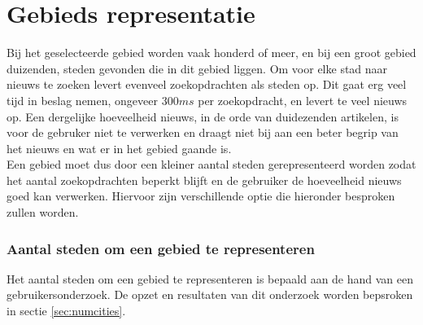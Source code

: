 \documentclass[twoside,openright]{uva-bachelor-thesis}
\begin{document}
	\section{Gebieds representatie}
		Bij het geselecteerde gebied worden vaak honderd of meer, en bij een groot gebied duizenden, steden gevonden die in dit gebied liggen. Om voor elke stad naar nieuws te zoeken levert evenveel zoekopdrachten als steden op. Dit gaat erg veel tijd in beslag nemen, ongeveer $300ms$ per zoekopdracht, en levert te veel nieuws op. Een dergelijke hoeveelheid nieuws, in de orde van duidezenden artikelen, is voor de gebruker niet te verwerken en draagt niet bij aan een beter begrip van het nieuws en wat er in het gebied gaande is.
		\\[0.5cm]
		Een gebied moet dus door een kleiner aantal steden gerepresenteerd worden zodat het aantal zoekopdrachten beperkt blijft en de gebruiker de hoeveelheid nieuws goed kan verwerken. Hiervoor zijn verschillende optie die hieronder besproken zullen worden.
		
		\subsubsection{Aantal steden om een gebied te representeren}
			Het aantal steden om een gebied te representeren is bepaald aan de hand van een gebruikersonderzoek. De opzet en resultaten van dit onderzoek worden bepsroken in sectie \ref{sec:numcities}.
\end{document}
